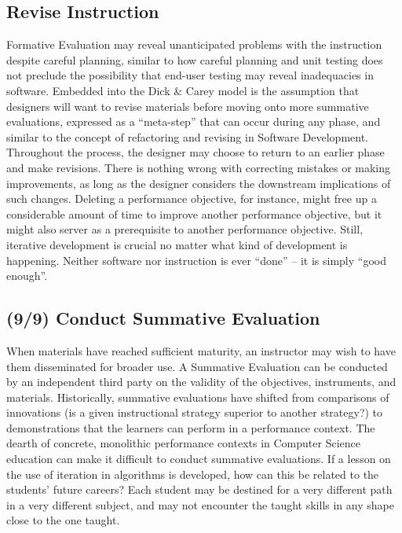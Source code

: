 \subsection{Revise Instruction}

Formative Evaluation may reveal unanticipated problems with the instruction despite careful planning, similar to how careful planning and unit testing does not preclude the possibility that end-user testing may reveal inadequacies in software.
Embedded into the Dick \& Carey model is the assumption that designers will want to revise materials before moving onto more summative evaluations, expressed as a ``meta-step'' that can occur during any phase, and similar to the concept of refactoring and revising in Software Development.
Throughout the process, the designer may choose to return to an earlier phase and make revisions.
There is nothing wrong with correcting mistakes or making improvements, as long as the designer considers the downstream implications of such changes.
Deleting a performance objective, for instance, might free up a considerable amount of time to improve another performance objective, but it might also server as a prerequisite to another performance objective.
Still, iterative development is crucial no matter what kind of development is happening.
Neither software nor instruction is ever ``done'' -- it is simply ``good enough''.


\subsection{(9/9) Conduct Summative Evaluation}

When materials have reached sufficient maturity, an instructor may wish to have them disseminated for broader use.
A Summative Evaluation can be conducted by an independent third party on the validity of the objectives, instruments, and materials.
Historically, summative evaluations have shifted from comparisons of innovations (is a given instructional strategy superior to another strategy?) to demonstrations that the learners can perform in a performance context.
The dearth of concrete, monolithic performance contexts in Computer Science education can make it difficult to conduct summative evaluations.
If a lesson on the use of iteration in algorithms is developed, how can this be related to the students' future careers?
Each student may be destined for a very different path in a very different subject, and may not encounter the taught skills in any shape close to the one taught.

